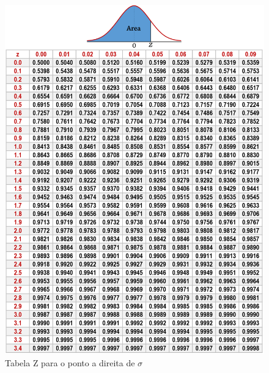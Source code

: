 \documentclass[a4paper,11pt]{article}
\begin{document}
\newpage
\begin{figure}[!htb]
	\centering
	\includegraphics[width=1.0\textwidth]{imagens/ztable2.png}
	\caption{Tabela Z para o ponto a direita de $\sigma$}
\end{figure}
\end{document}
